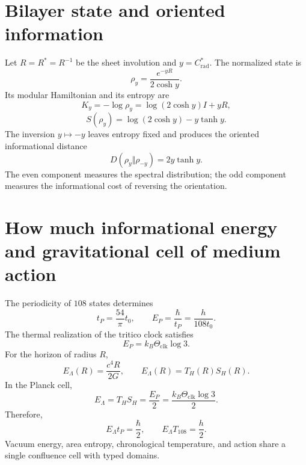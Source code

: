 \section{Bilayer state and oriented information}
\label{sec:l9s102:estado-bicapa}

Let \(R=R^*=R^{-1}\) be the sheet involution and
\(y=C^*_{\mathrm{rad}}\). The normalized state is
\begin{equation}
 \boxed{
 \rho_y=\frac{e^{-yR}}{2\cosh y}.}
 \label{eq:l9s102:rho-y}
\end{equation}
Its modular Hamiltonian and its entropy are
\begin{equation}
 K_y=-\log\rho_y=\log(2\cosh y)I+yR,
 \label{eq:l9s102:ky}
\end{equation}
\begin{equation}
 S(\rho_y)=\log(2\cosh y)-y\tanh y.
 \label{eq:l9s102:entropia-y}
\end{equation}
The inversion \(y\mapsto-y\) leaves entropy fixed and produces the oriented
informational distance
\begin{equation}
 \boxed{
 D(\rho_y\Vert\rho_{-y})=2y\tanh y.}
 \label{eq:l9s102:entropia-relativa-hojas}
\end{equation}
The even component measures the spectral distribution; the odd component measures
the informational cost of reversing the orientation.

\section{How much informational energy and gravitational cell of medium action}
\label{sec:l9s102:horizonte-media-accion}

The periodicity of \(108\) states determines
\begin{equation}
 t_P=\frac{54}{\pi}t_0,
 \qquad
 E_P=\frac{\hbar}{t_P}=\frac{h}{108t_0}.
 \label{eq:l9s102:ep-tp}
\end{equation}
The thermal realization of the tritico clock satisfies
\begin{equation}
 \boxed{
 E_P=k_B\Theta_{\mathrm{clk}}\log3.}
 \label{eq:l9s102:planck-trit}
\end{equation}
For the horizon of radius \(R\),
\begin{equation}
 E_\Lambda(R)=\frac{c^4R}{2G},
 \qquad
 E_\Lambda(R)=T_H(R)S_H(R).
 \label{eq:l9s102:energia-horizonte}
\end{equation}
In the Planck cell,
\begin{equation}
 \boxed{
 E_\Lambda
 =T_HS_H
 =\frac{E_P}{2}
 =\frac{k_B\Theta_{\mathrm{clk}}\log3}{2}.}
 \label{eq:l9s102:confluencia-horizonte}
\end{equation}
Therefore,
\begin{equation}
 \boxed{
 E_\Lambda t_P=\frac{\hbar}{2},
 \qquad
 E_\Lambda T_{108}=\frac h2.}
 \label{eq:l9s102:media-accion}
\end{equation}
Vacuum energy, area entropy, chronological temperature, and
action share a single confluence cell with typed domains.

